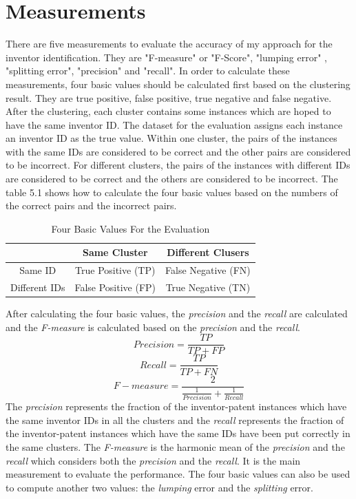 \section{Measurements}
There are five measurements to evaluate the accuracy of my approach for the inventor identification. They are "F-measure" or "F-Score", "lumping error" , "splitting error", "precision" and "recall". In order to calculate these measurements, four basic values should be calculated first based on the clustering result. They are true positive, false positive, true negative and false negative.  After the clustering, each cluster contains some instances which are hoped to have the same inventor ID. The dataset for the evaluation assigns each instance an inventor ID as the true value.  Within one cluster, the pairs of the instances with the same IDs are considered to be correct and the other pairs are considered to be incorrect. For different clusters, the pairs of the instances with different IDs are considered to be correct and the others are considered to be incorrect. The table 5.1 shows how to calculate the four basic values based on the numbers of the correct pairs and the incorrect pairs.
\begin{table}
\centering
\begin{tabular}{|c|c|c|}
\hline
 & Same Cluster & Different Clusers \\
 \hline
 Same ID & True Positive (TP) & False Negative (FN)  \\
 \hline
Different IDs & False Positive (FP) & True Negative (TN) \\
\hline
\end{tabular}
\caption{Four Basic Values For the Evaluation}
\end{table}
After calculating the four basic values, the \emph{precision} and the \emph{recall} are calculated and the \emph{F-measure} is calculated based on the \emph{precision} and the \emph{recall}. 
\begin{equation}
Precision =\frac{TP}{TP+FP}
\end{equation} 
\begin{equation}
Recall =\frac{TP}{TP+FN}
\end{equation} 
\begin{equation}
F-measure= \frac{2}{\frac{1}{Precision}+\frac{1}{Recall}}
\end{equation}
The \emph{precision} represents the fraction of the inventor-patent instances which have the same inventor IDs in all the clusters and the \emph{recall} represents the fraction of the inventor-patent instances which have the same IDs have been put correctly in the same clusters. The \emph{F-measure} is the harmonic mean of the \emph{precision} and the \emph{recall} which considers both the \emph{precision} and the \emph{recall}. It is the main measurement to evaluate the performance.  The four basic values can also be used to compute another two values: the \emph{lumping} error and the \emph{splitting} error.
